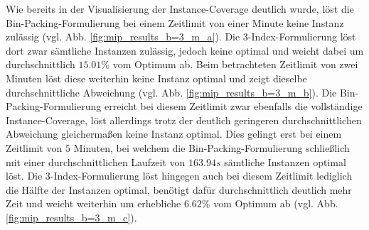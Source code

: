 Wie bereits in der Visualisierung der Instance-Coverage deutlich wurde, löst die Bin-Packing-Formulierung
bei einem Zeitlimit von einer Minute keine Instanz zulässig (vgl. Abb. \ref{fig:mip_results_b=3_m_a}).
Die 3-Index-Formulierung löst dort zwar sämtliche Instanzen zulässig, jedoch keine optimal und weicht
dabei um durchschnittlich $15.01 \%$ vom Optimum ab. Beim betrachteten Zeitlimit von zwei Minuten
löst diese weiterhin keine Instanz optimal und zeigt dieselbe durchschnittliche Abweichung
(vgl. Abb. \ref{fig:mip_results_b=3_m_b}). Die Bin-Packing-Formulierung erreicht bei diesem Zeitlimit zwar ebenfalls
die vollständige Instance-Coverage, löst allerdings trotz der deutlich geringeren durchschnittlichen Abweichung
gleichermaßen keine Instanz optimal. Dies gelingt erst bei einem Zeitlimit von $5$ Minuten, bei welchem die Bin-Packing-Formulierung schließlich mit einer durchschnittlichen Laufzeit von $163.94s$ sämtliche Instanzen optimal löst. Die 3-Index-Formulierung löst hingegen auch bei diesem Zeitlimit lediglich die Hälfte der Instanzen optimal, benötigt dafür durchschnittlich deutlich mehr Zeit und weicht weiterhin um erhebliche $6.62 \%$ vom
Optimum ab (vgl. Abb. \ref{fig:mip_results_b=3_m_c}).

